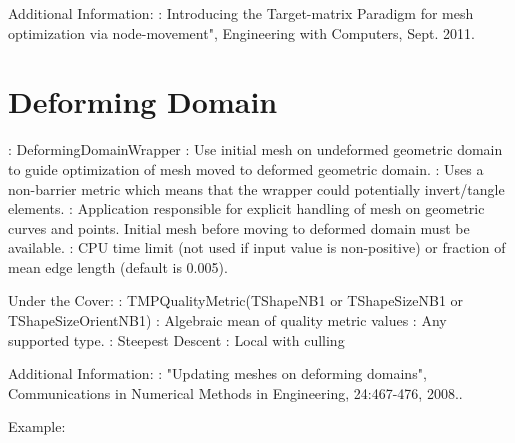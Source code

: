 \noindent Additional Information: \newline
{}: Introducing the Target-matrix Paradigm for mesh optimization via node-movement", Engineering with Computers, Sept. 2011.\newline

\newpage
\section{Deforming Domain} \label{sec:DeformingDomain}

: DeformingDomainWrapper \newline
{}:  Use initial mesh on undeformed geometric domain
to guide optimization of mesh moved to deformed geometric domain.  \newline
{}: Uses a non-barrier metric which means that the
wrapper could potentially invert/tangle elements.  \newline
{}:  Application responsible for explicit handling of mesh on geometric curves and points.  Initial mesh before moving to deformed domain must be available.\newline 
{}: CPU time limit (not used if input 
value is non-positive) or fraction of mean edge length (default is 0.005). \newline \newline

\noindent Under the Cover: \newline
{}: TMPQualityMetric(TShapeNB1 or TShapeSizeNB1 or TShapeSizeOrientNB1) \newline
{}: Algebraic mean of quality metric values \newline
{}: Any supported type. \newline
{}: Steepest Descent \newline
{}: Local with culling \newline

\noindent Additional Information: \newline
{}: "Updating meshes on deforming domains",  Communications in Numerical Methods in Engineering, 24:467-476, 2008..\newline

\noindent Example: \newline

